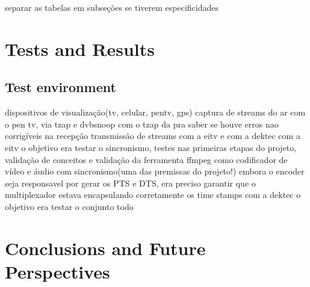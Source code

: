 \documentclass[
	12pt,				%
	openright,			%
	twoside,			%
	a4paper,			%
	brazil,
	french,				%
	english
	]{abntex2}
\begin{document}
separar as tabelas em subseções se tiverem especificidades


\chapter{Tests and Results}
%
\section{Test environment}
dispositivos de visualização(tv, celular, pentv, gps)
captura de streams do ar com o pen tv, via tzap e dvbsnoop
	com o tzap da pra saber se houve erros nao corrigíveis na recepção
transmissão de streams com a eitv e com a dektec
	com a eitv o objetivo era testar o sincronismo, testes nas primeiras etapas do projeto, validação de conceitos e validação da ferramenta ffmpeg como codificador de vídeo e áudio com sincronismo(uma das premissas do projeto!) embora o encoder seja responsavel por gerar os PTS e DTS, era preciso garantir que o multiplexador estava encapsulando corretamente os time stamps
	com a dektec o objetivo era testar o conjunto todo

%


\chapter*[Conclusions and Future Perspectives]{Conclusions and Future Perspectives}




\end{document}
